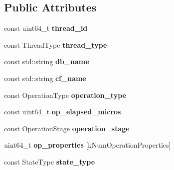 \subsection*{Public Attributes}
\begin{DoxyCompactItemize}
\item 
const uint64\+\_\+t {\bfseries thread\+\_\+id}\hypertarget{structrocksdb_1_1ThreadStatus_ae9dbcae092820837bf49faef018a0f8e}{}\label{structrocksdb_1_1ThreadStatus_ae9dbcae092820837bf49faef018a0f8e}

\item 
const Thread\+Type {\bfseries thread\+\_\+type}\hypertarget{structrocksdb_1_1ThreadStatus_aba191524bf36504fb9c9667f6b24039e}{}\label{structrocksdb_1_1ThreadStatus_aba191524bf36504fb9c9667f6b24039e}

\item 
const std\+::string {\bfseries db\+\_\+name}\hypertarget{structrocksdb_1_1ThreadStatus_ae64f84da019e6004d46ed9f4f61a74e0}{}\label{structrocksdb_1_1ThreadStatus_ae64f84da019e6004d46ed9f4f61a74e0}

\item 
const std\+::string {\bfseries cf\+\_\+name}\hypertarget{structrocksdb_1_1ThreadStatus_a9dd8ede28fdfdfd82a270bd4f2a4061e}{}\label{structrocksdb_1_1ThreadStatus_a9dd8ede28fdfdfd82a270bd4f2a4061e}

\item 
const Operation\+Type {\bfseries operation\+\_\+type}\hypertarget{structrocksdb_1_1ThreadStatus_a60018753ced677e0a5578d6a5b00346c}{}\label{structrocksdb_1_1ThreadStatus_a60018753ced677e0a5578d6a5b00346c}

\item 
const uint64\+\_\+t {\bfseries op\+\_\+elapsed\+\_\+micros}\hypertarget{structrocksdb_1_1ThreadStatus_a676b61bb3204c677d51c22bafd52ff39}{}\label{structrocksdb_1_1ThreadStatus_a676b61bb3204c677d51c22bafd52ff39}

\item 
const Operation\+Stage {\bfseries operation\+\_\+stage}\hypertarget{structrocksdb_1_1ThreadStatus_a9f3ac56a8a35303075426a10e5d872a3}{}\label{structrocksdb_1_1ThreadStatus_a9f3ac56a8a35303075426a10e5d872a3}

\item 
uint64\+\_\+t {\bfseries op\+\_\+properties} \mbox{[}k\+Num\+Operation\+Properties\mbox{]}\hypertarget{structrocksdb_1_1ThreadStatus_a765c3f69860ab43b00880bb7699ebd13}{}\label{structrocksdb_1_1ThreadStatus_a765c3f69860ab43b00880bb7699ebd13}

\item 
const State\+Type {\bfseries state\+\_\+type}\hypertarget{structrocksdb_1_1ThreadStatus_a951ce536f161702148c1303b9e20614f}{}\label{structrocksdb_1_1ThreadStatus_a951ce536f161702148c1303b9e20614f}

\end{DoxyCompactItemize}
